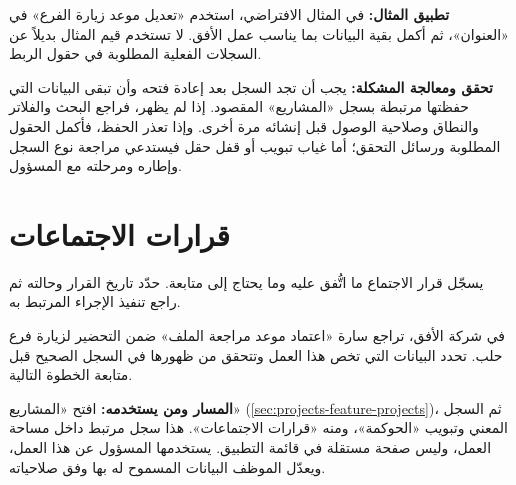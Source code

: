 \textbf{تطبيق المثال:} في المثال الافتراضي، استخدم «تعديل موعد زيارة الفرع» في «العنوان»، ثم أكمل بقية البيانات بما يناسب عمل الأفق. لا تستخدم قيم المثال بديلاً عن السجلات الفعلية المطلوبة في حقول الربط.

\textbf{تحقق ومعالجة المشكلة:} يجب أن تجد السجل بعد إعادة فتحه وأن تبقى البيانات التي حفظتها مرتبطة بسجل «المشاريع» المقصود. إذا لم يظهر، فراجع البحث والفلاتر والنطاق وصلاحية الوصول قبل إنشائه مرة أخرى. وإذا تعذر الحفظ، فأكمل الحقول المطلوبة ورسائل التحقق؛ أما غياب تبويب أو قفل حقل فيستدعي مراجعة نوع السجل وإطاره ومرحلته مع المسؤول.

\clearpage
\section{قرارات الاجتماعات}
\label{sec:projects-feature-meeting-decisions}

يسجّل قرار الاجتماع ما اتُّفق عليه وما يحتاج إلى متابعة. حدّد تاريخ القرار وحالته ثم راجع تنفيذ الإجراء المرتبط به.

\begin{rcnote}
في شركة الأفق، تراجع سارة «اعتماد موعد مراجعة الملف» ضمن التحضير لزيارة فرع حلب. تحدد البيانات التي تخص هذا العمل وتتحقق من ظهورها في السجل الصحيح قبل متابعة الخطوة التالية.
\end{rcnote}

\textbf{المسار ومن يستخدمه:} افتح «المشاريع» (\ref{sec:projects-feature-projects})، ثم السجل المعني وتبويب «الحوكمة»، ومنه «قرارات الاجتماعات». هذا سجل مرتبط داخل مساحة العمل، وليس صفحة مستقلة في قائمة التطبيق. يستخدمها المسؤول عن هذا العمل، ويعدّل الموظف البيانات المسموح له بها وفق صلاحياته.

